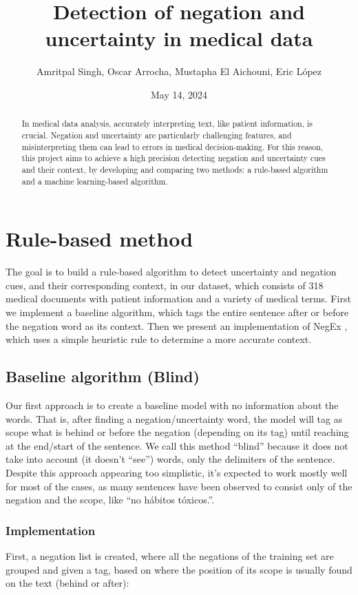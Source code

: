 \documentclass{article}
\begin{document}
\title{Detection of negation and uncertainty in medical data}
\author{Amritpal Singh, Oscar Arrocha, Mustapha El Aichouni, Eric López}
\date{May 14, 2024}
\maketitle

\begin{abstract}
	In medical data analysis, accurately interpreting text, like patient information, is crucial.
	Negation and uncertainty are particularly challenging features, and misinterpreting them can
	lead to errors in medical decision-making. For this reason, this project aims to achieve a high
	precision detecting negation and uncertainty cues and their context, by developing and comparing
	two methods: a rule-based algorithm and a machine learning-based algorithm.
\end{abstract}

\section*{Rule-based method}
The goal is to build a rule-based algorithm to detect uncertainty and negation cues, and their
corresponding context, in our dataset, which consists of 318 medical documents with patient information
and a variety of medical terms. First we implement a baseline algorithm, which tags the entire sentence
after or before the negation word as its context. Then we present an implementation of NegEx \cite{negex},
which uses a simple heuristic rule to determine a more accurate context.

\subsection*{Baseline algorithm (Blind)}
Our first approach is to create a baseline model with no information about the words. That is, after
finding a negation/uncertainty word, the model will tag as scope what is behind or before the negation
(depending on its tag) until reaching at the end/start of the sentence. We call this method “blind”
because it does not take into account (it doesn’t “see”) words, only the delimiters of the sentence.
Despite this approach appearing too simplistic, it’s expected to work mostly well for most of the cases,
as many sentences have been observed to consist only of the negation and the scope, like “no hábitos tóxicos.”.

\subsubsection*{Implementation}
First, a negation list is created, where all the negations of the training set are grouped and given a tag,
based on where the position of its scope is usually found on the text (behind or after):
\end{document}

